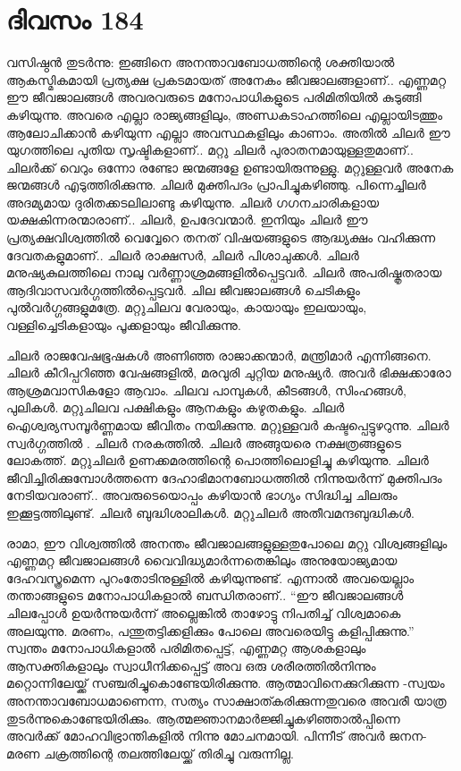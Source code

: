\section{ദിവസം 184}


വസിഷ്ഠൻ തുടർന്നു: ഇങ്ങിനെ അനന്താവബോധത്തിന്റെ ശക്തിയാൽ ആകസ്മികമായി പ്രത്യക്ഷ പ്രകടമായത് അനേകം ജീവജാലങ്ങളാണ്‌.. എണ്ണമറ്റ ഈ ജീവജാലങ്ങൾ അവരവരുടെ മനോപാധികളുടെ പരിമിതിയിൽ കുടുങ്ങി കഴിയുന്നു. അവരെ എല്ലാ രാജ്യങ്ങളിലും, അണ്ഡകടാഹത്തിലെ എല്ലായിടത്തും ആലോചിക്കാൻ കഴിയുന്ന എല്ലാ അവസ്ഥകളിലും കാണാം. അതിൽ ചിലർ ഈ യുഗത്തിലെ പുതിയ സൃഷ്ടികളാണ്‌.. മറ്റു ചിലർ പുരാതനമായുള്ളതുമാണ്‌.. ചിലർക്ക് വെറും ഒന്നോ രണ്ടോ ജന്മങ്ങളേ ഉണ്ടായിരുന്നുള്ളു. മറ്റുള്ളവർ അനേക ജന്മങ്ങൾ എടുത്തിരിക്കുന്നു. ചിലർ മുക്തിപദം പ്രാപിച്ചുകഴിഞ്ഞു. പിന്നെച്ചിലർ അദമ്യമായ ദുരിതക്കടലിലാണ്ടു കഴിയുന്നു. ചിലർ ഗഗനചാരികളായ യക്ഷകിന്നരന്മാരാണ്‌.. ചിലർ, ഉപദേവന്മാർ. ഇനിയും ചിലർ ഈ പ്രത്യക്ഷവിശ്വത്തിൽ വെവ്വേറെ തനത് വിഷയങ്ങളുടെ ആദ്ധ്യക്ഷം വഹിക്കുന്ന ദേവതകളുമാണ്‌.. ചിലർ രാക്ഷസർ, ചിലർ പിശാചുക്കൾ. ചിലർ മനുഷ്യകുലത്തിലെ നാലു വർണ്ണാശ്രമങ്ങളിൽപ്പെട്ടവർ. ചിലർ അപരിഷ്കൃതരായ ആദിവാസവർഗ്ഗത്തിൽപ്പെട്ടവർ. ചില ജീവജാലങ്ങൾ ചെടികളും പുൽവർഗ്ഗങ്ങളുമത്രേ. മറ്റുചിലവ വേരായും, കായായും ഇലയായും, വള്ളിച്ചെടികളായും പൂക്കളായും ജീവിക്കുന്നു.

ചിലർ രാജവേഷഭൂഷകൾ അണിഞ്ഞ രാജാക്കന്മാർ, മന്ത്രിമാർ എന്നിങ്ങനെ. ചിലർ കീറിപ്പറിഞ്ഞ വേഷങ്ങളില്‍, മരവുരി ചുറ്റിയ മനുഷ്യർ. അവർ ഭിക്ഷക്കാരോ ആശ്രമവാസികളോ ആവാം. ചിലവ പാമ്പുകൾ, കീടങ്ങൾ, സിംഹങ്ങൾ, പുലികൾ. മറ്റുചിലവ പക്ഷികളും ആനകളും കഴുതകളും. ചിലർ ഐശ്വര്യസമ്പൂർണ്ണമായ ജീവിതം നയിക്കുന്നു. മറ്റുള്ളവർ കഷ്ടപ്പെട്ടുഴറുന്നു. ചിലർ സ്വർഗ്ഗത്തിൽ . ചിലർ നരകത്തിൽ. ചിലർ അങ്ങുയരെ നക്ഷത്രങ്ങളുടെ ലോകത്ത്. മറ്റുചിലർ ഉണക്കമരത്തിന്റെ പൊത്തിലൊളിച്ചു കഴിയുന്നു. ചിലർ ജീവിച്ചിരിക്കുമ്പോൾത്തന്നെ ദേഹാഭിമാനബോധത്തിൽ നിന്നുയർന്ന് മുക്തിപദം നേടിയവരാണ്‌.. അവരുടെയൊപ്പം കഴിയാൻ ഭാഗ്യം സിദ്ധിച്ച ചിലരും ഇക്കൂട്ടത്തിലുണ്ട്. ചിലർ ബുദ്ധിശാലികൾ. മറ്റുചിലർ അതീവമന്ദബുദ്ധികൾ.

രാമാ, ഈ വിശ്വത്തിൽ അനന്തം ജീവജാലങ്ങളുള്ളതുപോലെ മറ്റു വിശ്വങ്ങളിലും എണ്ണമറ്റ ജീവജാലങ്ങൾ വൈവിദ്ധ്യമാർന്നതെങ്കിലും അനുയോജ്യമായ ദേഹവസ്ത്രമെന്ന പുറംതോടിനുള്ളിൽ കഴിയുന്നുണ്ട്. എന്നാൽ അവയെല്ലാം തന്താങ്ങളുടെ മനോപാധികളാൽ ബന്ധിതരാണ്‌.. “ഈ ജീവജാലങ്ങൾ ചിലപ്പോൾ ഉയർന്നുയർന്ന് അല്ലെങ്കിൽ താഴോട്ടു നിപതിച്ച് വിശ്വമാകെ അലയുന്നു. മരണം, പന്തുതട്ടിക്കളിക്കും പോലെ അവരെയിട്ടു കളിപ്പിക്കുന്നു.” സ്വന്തം മനോപാധികളാൽ പരിമിതപ്പെട്ട്, എണ്ണമറ്റ ആശകളാലും ആസക്തികളാലും സ്വാധീനിക്കപ്പെട്ട് അവ ഒരു ശരീരത്തിൽനിന്നും മറ്റൊന്നിലേയ്ക്ക് സഞ്ചരിച്ചുകൊണ്ടേയിരിക്കുന്നു. ആത്മാവിനെക്കുറിക്കുന്ന -സ്വയം അനന്താവബോധമാണെന്ന, സത്യം സാക്ഷാത്കരിക്കുന്നതുവരെ അവരീ യാത്ര തുടർന്നുകൊണ്ടേയിരിക്കും. ആത്മജ്ഞാനമാർജ്ജിച്ചുകഴിഞ്ഞാൽപ്പിന്നെ അവർക്ക് മോഹവിഭ്രാന്തികളിൽ നിന്നു മോചനമായി. പിന്നീട് അവർ ജനന-മരണ ചക്രത്തിന്റെ തലത്തിലേയ്ക്ക് തിരിച്ചു വരുന്നില്ല. 

